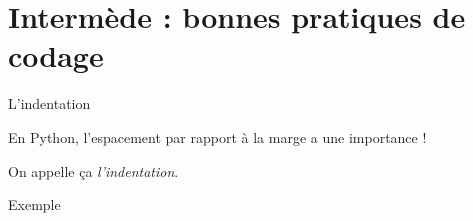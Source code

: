 \documentclass{beamer}
\begin{document}
\section{Intermède : bonnes pratiques de codage}

\begin{frame}{L'indentation}

  \pause

  En Python, l'espacement par rapport à la marge a une importance !

  \MVRightArrow{} On appelle ça \emph{l'indentation}.

  \begin{exampleblock}{Exemple}
  \end{exampleblock}

\end{frame}



\end{document}
